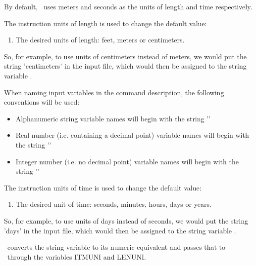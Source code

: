 \label{texfile:Units}
By default, \mut\ uses meters and seconds as the units of length and time respectively.

The instruction \textsf{units of length} is used to change the default value:

    {
        \squish
        \begin{enumerate}
        \item {}  The desired units of length: feet, meters or centimeters.
        \end{enumerate}

        So, for example, to use units of centimeters instead of meters, we would put the string 'centimeters' in the input file, which would then be assigned to the string variable . }

When naming input variables in the command description, the following conventions will be used:
\begin{itemize}
    \item Alphanumeric string variable names will begin with
    the string '\str{}'
    \item Real number (i.e. containing a decimal point) variable names will begin with
    the string '\rnum{}'
    \item Integer number (i.e. no decimal point) variable names will begin with
    the string '\inum{}'
\end{itemize}

The instruction \textsf{units of time} is used to change the default value:

    {
        \squish
        \begin{enumerate}
        \item {}  The desired unit of time: seconds, minutes, hours, days or years.
        \end{enumerate}

        So, for example, to use units of days instead of seconds, we would put the string 'days' in the input file, which would then be assigned to the string variable .
    }

\mut\ converts the string variable  to its numeric equivalent and passes that to \mfus\ through the variables \textsf{ITMUNI} and \textsf{LENUNI}.


